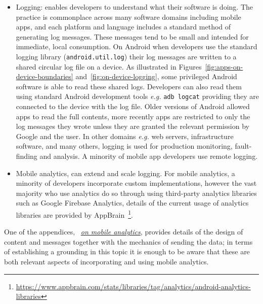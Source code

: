 \begin{itemize}
    \item Logging: enables developers to understand what their software is doing. The practice is commonplace across many software domains including mobile apps, and each platform and language includes a standard method of generating log messages. These messages tend to be small and intended for immediate, local consumption. On Android when developers use the standard logging library (\texttt{android.util.log}) their log messages are written to a shared circular log file on a device. As illustrated in Figures~\ref{fig:apps-on-device-boundaries} and~\ref{fig:on-device-logging}, some privileged Android software is able to read these shared logs. Developers can also read them using standard Android development tools \emph{e.g.} \texttt{adb logcat} providing they are connected to the device with the log file. Older versions of Android allowed apps to read the full contents, more recently apps are restricted to only the log messages they wrote unless they are granted the relevant permission by Google and the user. 
    In other domains \emph{e.g.} web servers, infrastructure software, and many others, logging is used for production monitoring, fault-finding and analysis. A minority of mobile app developers use remote logging.
    \item Mobile analytics, can extend and scale logging. For mobile analytics, a minority of developers incorporate custom implementations, however the vast majority who use analytics do so through using third-party analytics libraries such as Google Firebase Analytics, details of the current usage of analytics libraries are provided by AppBrain~\footnote{\url{https://www.appbrain.com/stats/libraries/tag/analytics/android-analytics-libraries}}.
\end{itemize}

One of the appendices, ~\href{chapter-on-mobile-analytics}{\textit{on mobile analytics}}, provides details of the design of content and messages together with the mechanics of sending the data; in terms of establishing a grounding in this topic it is enough to be aware that these are both relevant aspects of incorporating and using mobile analytics.


